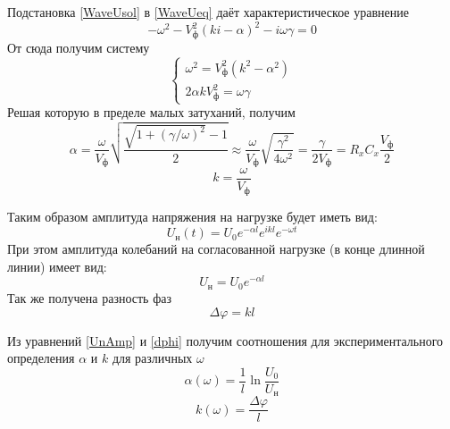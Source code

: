 \documentclass[a4paper,12pt]{article}
\theoremstyle{definition}
\begin{document}
 	Подстановка \eqref{WaveUsol} в \eqref{WaveUeq} даёт характеристическое уравнение
 	\begin{equation}
 		-\omega^2-V_\text{ф}^2(ki-\alpha)^2-i\omega\gamma=0
 	\end{equation}
 	От сюда получим систему
 	\begin{equation}
 		\begin{cases}
 			\omega^2=V_\text{ф}^2(k^2-\alpha^2)
 			\\
 			2\alpha kV_\text{ф}^2=\omega\gamma
 		\end{cases}
 	\end{equation}
 	Решая которую в пределе малых затуханий, получим
 	\begin{equation}\label{alphaSol}
 		\alpha=\frac{\omega}{V_\text{ф}}\sqrt{\frac{\sqrt{1+(\gamma/\omega)^2}-1}{2}}\approx\frac{\omega}{V_\text{ф}}\sqrt{\frac{\gamma^2}{4\omega^2}}=\frac{\gamma}{2V_\text{ф}}=R_xC_x\frac{V_\text{ф}}{2}
 	\end{equation}
 	\begin{equation}\label{kSol}
 		k=\frac{\omega}{V_\text{ф}}
 	\end{equation}
 	
 	Таким образом амплитуда напряжения на нагрузке будет иметь вид:
 	\begin{equation}\label{Un}
 		U_\text{н}(t)=U_0e^{-\alpha l}e^{ikl}e^{-\omega t}
 	\end{equation}
 	При этом амплитуда колебаний на согласованной нагрузке (в конце длинной линии) имеет вид:
 	\begin{equation}\label{UnAmp}
 		U_\text{н}=U_0e^{-\alpha l}
 	\end{equation}
 	Так же получена разность фаз
 	\begin{equation}\label{dphi}
 		\Delta \varphi=kl
 	\end{equation}
 	
 	Из уравнений \eqref{UnAmp} и \eqref{dphi} получим соотношения для экспериментального определения $\alpha$ и $k$ для различных $\omega$
 	\begin{equation}\label{alphaomega}
 		\alpha(\omega)=\frac{1}{l}\ln\frac{U_0}{U_\text{н}}
 	\end{equation}
 	\begin{equation}\label{komega}
 		k(\omega)=\frac{\Delta \varphi}{l}
 	\end{equation}
\end{document}

